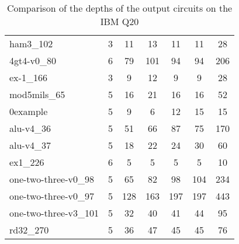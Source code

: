 \documentclass[journal]{IEEEtran}
\begin{document}
\begin{table*}[htbp]
\begin{center}
\begin{tabular}{|p{4.3cm}<{\centering}|c|c|c|c|c|c|}
ham3\_102 & 3 & 11 & 13 & 11 & 11 & 28 \\
4gt4-v0\_80 & 6 & 79 & 101 & 94 & 94 & 206 \\
ex-1\_166 & 3 & 9 & 12 & 9 & 9 & 28 \\
mod5mils\_65 & 5 & 16 & 21 & 16 & 16 & 52 \\
0example & 5 & 9 & 6 & 12 & 15 & 15 \\
alu-v4\_36 & 5 & 51 & 66 & 87 & 75 & 170 \\
alu-v4\_37 & 5 & 18 & 22 & 24 & 30 & 60 \\
ex1\_226 & 6 & 5 & 5 & 5 & 5 & 10 \\
one-two-three-v0\_98 & 5 & 65 & 82 & 98 & 104 & 234 \\
one-two-three-v0\_97 & 5 & 128 & 163 & 197 & 197 & 443 \\
one-two-three-v3\_101 & 5 & 32 & 40 & 41 & 44 & 95 \\
rd32\_270 & 5 & 36 & 47 & 45 & 45 & 76 \\
                    \hline
                        \end{tabular} 
                        \end{center} 	
                        \caption{Comparison of  the depths of the output circuits on the IBM Q20} 
                        \label{tab5}
                    \end{table*}
\end{document}
